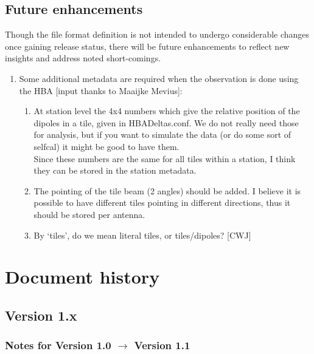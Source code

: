 \documentclass[a4paper,10pt,bibtotoc]{scrartcl}
\begin{document}
\subsection{Future enhancements}

Though the file format definition is not intended to undergo
considerable changes once gaining release status, there will be future
enhancements to reflect new insights and address noted short-comings.

\begin{enumerate}
\item Some additional metadata are required when the observation is
  done using the HBA [input thanks to Maaijke Mevius]:
  \begin{enumerate}
  \item At station level the 4x4 numbers which give the relative
    position of the dipoles in a tile, given in HBADeltas.conf. We do
    not really need those for analysis, but if you want to simulate
    the data (or do some sort of selfcal) it might be good to have
    them. \\
    Since these numbers are the same for all tiles within a station, I
    think they can be stored in the station metadata.
  \item The pointing of the tile beam (2 angles) should be added. I
    believe it is possible to have different tiles pointing in
    different directions, thus it should be stored per antenna.
  \item By `tiles', do we mean literal tiles, or tiles/dipoles? [CWJ]
  \end{enumerate}
\end{enumerate}


\clearpage

\section*{Document history}


\subsection{Version 1.x}

\subsubsection*{Notes for Version 1.0 $\rightarrow$ Version 1.1}
\end{document}
